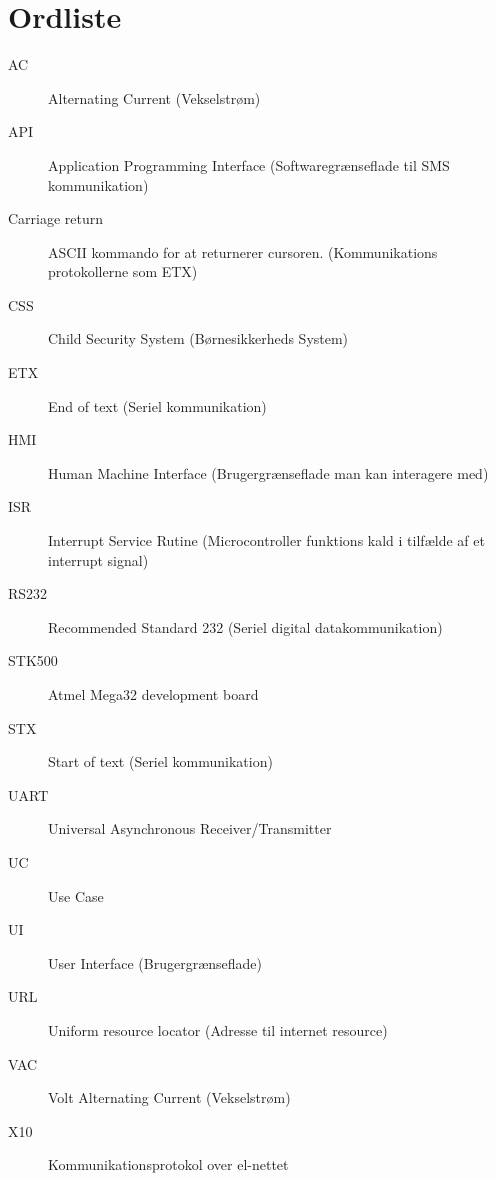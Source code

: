 \chapter{Ordliste}

\begin{description}

\item[AC] Alternating Current (Vekselstrøm)
\item[API] Application Programming Interface (Softwaregrænseflade til SMS kommunikation)
\item[Carriage return] ASCII kommando for at returnerer cursoren. (Kommunikations protokollerne som ETX)
\item[CSS] Child Security System (Børnesikkerheds System)
\item[ETX] End of text (Seriel kommunikation)
\item[HMI] Human Machine Interface (Brugergrænseflade man kan interagere med)
\item[ISR] Interrupt Service Rutine (Microcontroller funktions kald i tilfælde af et interrupt signal)
\item[RS232] Recommended Standard 232 (Seriel digital datakommunikation)
\item[STK500] Atmel Mega32 development board
\item[STX] Start of text (Seriel kommunikation)
\item[UART] Universal Asynchronous Receiver/Transmitter
\item[UC] Use Case
\item[UI] User Interface (Brugergrænseflade)
\item[URL] Uniform resource locator (Adresse til internet resource)
\item[VAC] Volt Alternating Current (Vekselstrøm)
\item[X10] Kommunikationsprotokol over el-nettet

\end{description}